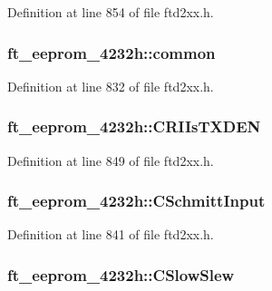 Definition at line 854 of file ftd2xx.h.\hypertarget{structft__eeprom__4232h_acfee0a972954d9a20c82fcd18b082194}{
\subsubsection[{common}]{ {\bf ft\_\-eeprom\_\-4232h::common}}}
\label{structft__eeprom__4232h_acfee0a972954d9a20c82fcd18b082194}


Definition at line 832 of file ftd2xx.h.\hypertarget{structft__eeprom__4232h_a7b4666be110ff5f59976c3a5f67ba13d}{
\subsubsection[{CRIIsTXDEN}]{ {\bf ft\_\-eeprom\_\-4232h::CRIIsTXDEN}}}
\label{structft__eeprom__4232h_a7b4666be110ff5f59976c3a5f67ba13d}


Definition at line 849 of file ftd2xx.h.\hypertarget{structft__eeprom__4232h_a30fb25eb86d7e47668b6a044e6196705}{
\subsubsection[{CSchmittInput}]{ {\bf ft\_\-eeprom\_\-4232h::CSchmittInput}}}
\label{structft__eeprom__4232h_a30fb25eb86d7e47668b6a044e6196705}


Definition at line 841 of file ftd2xx.h.\hypertarget{structft__eeprom__4232h_a6d92eb606cbe5c251751cd2d6fd8bebe}{
\subsubsection[{CSlowSlew}]{ {\bf ft\_\-eeprom\_\-4232h::CSlowSlew}}}
\label{structft__eeprom__4232h_a6d92eb606cbe5c251751cd2d6fd8bebe}


